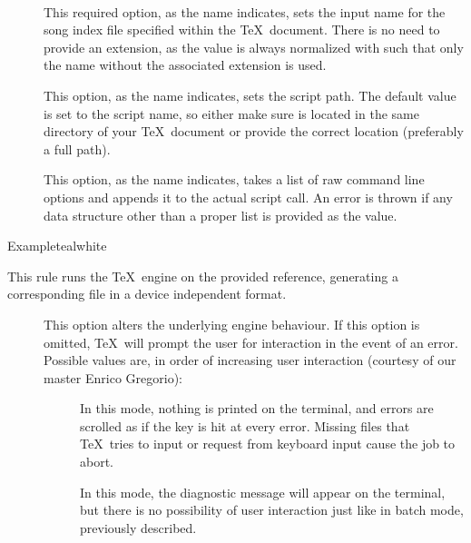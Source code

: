 \begin{description}
\begin{description}
\item[~\rqbox] This required option, as the name indicates, sets the input name for the song index file specified within the \TeX\ document. There is no need to provide an extension, as the value is always normalized with  such that only the name without the associated extension is used.

\item[] This option, as the name indicates, sets the script path. The default value is set to the script name, so either make sure  is located in the same directory of your \TeX\ document or provide the correct location (preferably a full path).

\item[] This option, as the name indicates, takes a list of raw command line options and appends it to the actual script call. An error is thrown if any data structure other than a proper list is provided as the value.
\end{description}

\begin{codebox}{Example}{teal}{\icnote}{white}
\end{codebox}

\item[\rulebox{tex}{Marco Daniel, Paulo Cereda}] This rule runs the  \TeX\ engine on the provided  reference, generating a corresponding file in a device independent format.

\begin{description}
\item[] This option alters the underlying engine behaviour. If this option is omitted, \TeX\ will prompt the user for interaction in the event of an error. Possible values are, in order of increasing user interaction (courtesy of our master Enrico Gregorio):

\begin{description}
\item[] In this mode, nothing is printed on the terminal, and errors are scrolled as if the  key is hit at every error. Missing files that \TeX\ tries to input or request from keyboard input cause the job to abort.

\item[] In this mode, the diagnostic message will appear on the terminal, but there is no possibility of user interaction just like in batch mode, previously described.


\end{description}
\end{description}
\end{description}
